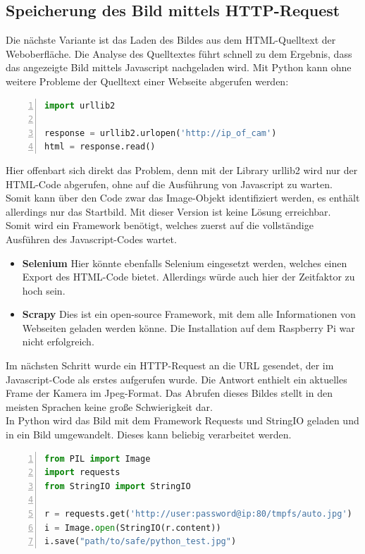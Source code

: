\subsection{Speicherung des Bild mittels HTTP-Request} \label{subsec:kapitel-httprequest}

Die nächste Variante ist das Laden des Bildes aus dem HTML-Quelltext der Weboberfläche. Die Analyse des Quelltextes führt schnell zu dem Ergebnis, dass das angezeigte Bild mittels Javascript nachgeladen wird. Mit Python kann ohne weitere Probleme der Quelltext einer Webseite abgerufen werden: 
\begin{lstlisting}[caption = Testcode - HTTP-Request mit urllib2 in Python, language=python, frame=single, breaklines=true,columns=fullflexible, commentstyle=\color{gray}\upshape, captionpos=b, numbers = left]
import urllib2

response = urllib2.urlopen('http://ip_of_cam')
html = response.read()
\end{lstlisting}
Hier offenbart sich direkt das Problem, denn mit der Library urllib2\cite{urllib2} wird nur der HTML-Code abgerufen, ohne auf die Ausführung von Javascript zu warten\cite{urllib2-problem}. Somit kann über den Code zwar das Image-Objekt identifiziert werden, es enthält allerdings nur das Startbild. Mit dieser Version ist keine Lösung erreichbar. \\
Somit wird ein Framework benötigt, welches zuerst auf die vollständige Ausführen des Javascript-Codes wartet.
\begin{itemize}
	\item \textbf{Selenium}
	Hier könnte ebenfalls Selenium eingesetzt werden, welches einen Export des HTML-Code bietet. Allerdings würde auch hier der Zeitfaktor zu hoch sein. 
	\item \textbf{Scrapy}
	Dies ist ein open-source Framework, mit dem alle Informationen von Webseiten geladen werden könne. Die Installation auf dem Raspberry Pi war nicht erfolgreich.
\end{itemize}
Im nächsten Schritt wurde ein HTTP-Request an die URL gesendet, der im Javascript-Code als erstes aufgerufen wurde. Die Antwort enthielt ein aktuelles Frame der Kamera im Jpeg-Format. Das Abrufen dieses Bildes stellt in den meisten Sprachen keine große Schwierigkeit dar. \\
In Python wird das Bild mit dem Framework Requests\cite{requests} und StringIO\cite{stringio} geladen und in ein Bild umgewandelt. Dieses kann beliebig verarbeitet werden. 
\begin{lstlisting}[caption = Abrufen eines BIldes von einer URL in Python, language=python, frame=single, breaklines=true,columns=fullflexible, commentstyle=\color{gray}\upshape, captionpos=b, numbers = left]
from PIL import Image
import requests
from StringIO import StringIO

r = requests.get('http://user:password@ip:80/tmpfs/auto.jpg')
i = Image.open(StringIO(r.content))
i.save("path/to/safe/python_test.jpg")
\end{lstlisting}
